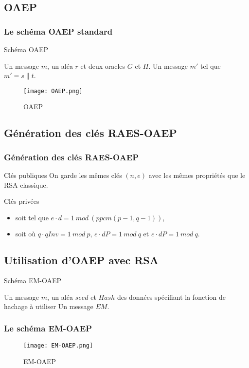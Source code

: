 \documentclass[10pt]{beamer}
\theoremstyle{plain}
\theoremstyle{definition}
\theoremstyle{remark}
\begin{document}
\subsection{OAEP}
\begin{frame}
\transwipe
\frametitle{Le schéma OAEP standard}
\begin{algorithm}[H]
\caption{Schéma OAEP}
\label{oaep}
\begin{algorithmic} 
\REQUIRE Un message $m$, un aléa $r$ et deux oracles $G$ et $H$.
\ENSURE Un message $m'$ tel que $m' = s\parallel t$.
\end{algorithmic}
\end{algorithm}
\begin{figure}[H]
\centering
\texttt{[image: OAEP.png]}
\caption{OAEP}
\end{figure}
\end{frame}
\subsection{Génération des clés RAES-OAEP}
\begin{frame}
\frametitle{Génération des clés RAES-OAEP}
\transwipe
\begin{block}{Clés publiques}
On garde les mêmes clés $(n, e)$ avec les mêmes propriétés que le RSA classique.
\end{block}
\begin{block}{Clés privées}	
\begin{itemize}
	\item soit  tel que $e\cdot d = 1\ mod\ (ppcm(p - 1, q - 1))$,
	\item soit  où $q\cdot qInv = 1\ mod\ p$, $e\cdot dP = 1\ mod\ q$ et $e\cdot dP = 1\ mod\ q$.
	\end{itemize}
\end{block}
\end{frame}
\subsection{Utilisation d'OAEP avec RSA}
\begin{frame}
\transwipe
\begin{algorithm}[H]
\caption{Schéma EM-OAEP}
\label{oaep}
\begin{algorithmic} 
\REQUIRE Un message $m$, un aléa $seed$ et $Hash$ des données spécifiant la fonction de hachage à utiliser
\ENSURE Un message $EM$.
\end{algorithmic}
\end{algorithm}
\frametitle{Le schéma EM-OAEP}
\begin{figure}[H]
\centering
\texttt{[image: EM-OAEP.png]}
\caption{EM-OAEP}
\end{figure}
\end{frame}
\end{document}
